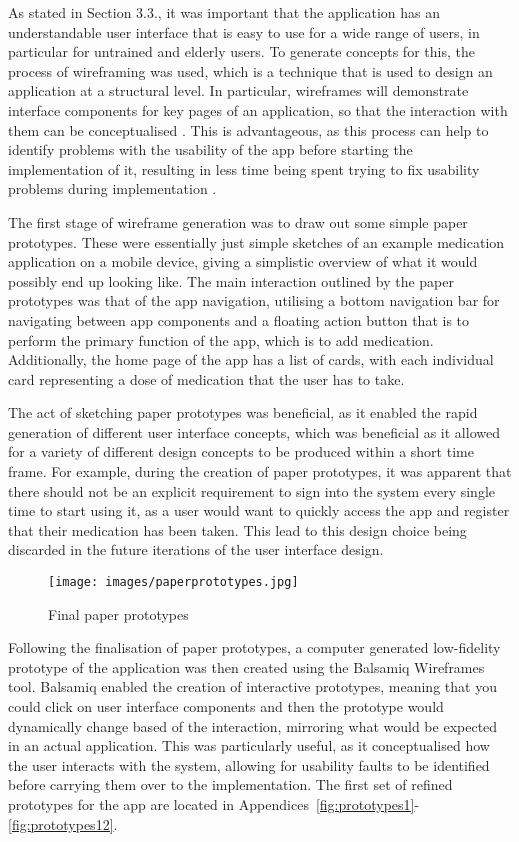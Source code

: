 \documentclass{l4proj}
\begin{document}
As stated in Section 3.3., it was important that the application has an understandable user interface that is easy to use for a wide range of users, in particular for untrained and elderly users. To generate concepts for this, the process of wireframing was used, which is a technique that is used to design an application at a structural level. In particular, wireframes will demonstrate interface components for key pages of an application, so that the interaction with them can be conceptualised \citep{rees}. This is advantageous, as this process can help to identify problems with the usability of the app before starting the implementation of it, resulting in less time being spent trying to fix usability problems during implementation \citep{snyder2003paper}.  

The first stage of wireframe generation was to draw out some simple paper prototypes. These were essentially just simple sketches of an example medication application on a mobile device, giving a simplistic overview of what it would possibly end up looking like. The main interaction outlined by the paper prototypes was that of the app navigation, utilising a bottom navigation bar for navigating between app components and a floating action button that is to perform the primary function of the app, which is to add medication. Additionally, the home page of the app has a list of cards, with each individual card representing a dose of medication that the user has to take.

The act of sketching paper prototypes was beneficial, as it enabled the rapid generation of different user interface concepts, which was beneficial as it allowed for a variety of different design concepts to be produced within a short time frame. For example, during the creation of paper prototypes, it was apparent that there should not be an explicit requirement to sign into the system every single time to start using it, as a user would want to quickly access the app and register that their medication has been taken. This lead to this design choice being discarded in the future iterations of the user interface design.

\begin{figure}[]
      \centering
      \texttt{[image: images/paperprototypes.jpg]}
      \caption{Final paper prototypes}
      \label{fig:Final paper prototypes}
\end{figure}
\newpage

Following the finalisation of paper prototypes, a computer generated low-fidelity prototype of the application was then created using the Balsamiq Wireframes tool. Balsamiq enabled the creation of interactive prototypes, meaning that you could click on user interface components and then the prototype would dynamically change based of the interaction, mirroring what would be expected in an actual application. This was particularly useful, as it conceptualised how the user interacts with the system, allowing for usability faults to be identified before carrying them over to the implementation. The first set of refined prototypes for the app are located in Appendices~\ref{fig:prototypes1}-\ref{fig:prototypes12}.
\end{document}
